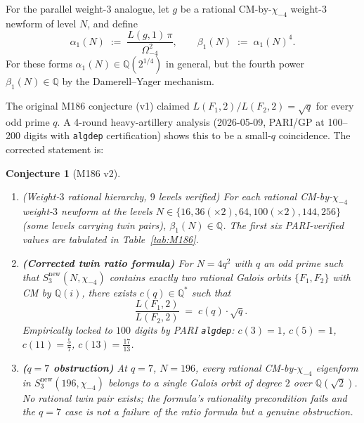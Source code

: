 \documentclass[12pt]{amsart}
\newtheorem{conjecture}[theorem]{Conjecture}
\theoremstyle{definition}
\newcommand{\Q}{\mathbb{Q}}
\begin{document}
For the parallel weight-$3$ analogue, let $g$ be a rational
CM-by-$\chi_{-4}$ weight-$3$ newform of level $N$, and define
\[
  \alpha_1(N) \;:=\; \frac{L(g,1)\,\pi}{\Omega_{-4}^2}, \qquad
  \beta_1(N) \;:=\; \alpha_1(N)^4.
\]
For these forms $\alpha_1(N) \in \Q(2^{1/4})$ in general, but the
fourth power $\beta_1(N) \in \Q$ by the Damerell--Yager mechanism.

The original M186 conjecture (v1) claimed $L(F_1,2)/L(F_2,2)=\sqrt{q}$
for every odd prime $q$.  A 4-round heavy-artillery analysis (2026-05-09,
PARI/GP at 100--200 digits with \texttt{algdep} certification) shows this
to be a small-$q$ coincidence.  The corrected statement is:

\begin{conjecture}[M186 v2]\label{conj:M186}
\leavevmode
\begin{enumerate}[leftmargin=2em]
  \item (Weight-$3$ rational hierarchy, $9$ levels verified) For each
    rational CM-by-$\chi_{-4}$ weight-$3$ newform at the levels
    $N \in \{16, 36(\times 2), 64, 100(\times 2), 144, 256\}$ (some
    levels carrying twin pairs), $\beta_1(N) \in \Q$. The first six
    PARI-verified values are tabulated in Table~\ref{tab:M186}.
  \item \textbf{(Corrected twin ratio formula)} For $N = 4q^2$ with $q$
    an odd prime such that $S_3^{\mathrm{new}}(N,\chi_{-4})$ contains
    exactly two rational Galois orbits $\{F_1,F_2\}$ with CM by
    $\Q(i)$, there exists $c(q)\in\Q^*$ such that
    \[
      \frac{L(F_1,2)}{L(F_2,2)} \;=\; c(q)\cdot\sqrt{q}.
    \]
    Empirically locked to $100$ digits by PARI \texttt{algdep}:
    $c(3)=1$, $c(5)=1$, $c(11)=\tfrac{5}{7}$, $c(13)=\tfrac{17}{13}$.
  \item \textbf{($q=7$ obstruction)} At $q=7$, $N=196$, every rational
    CM-by-$\chi_{-4}$ eigenform in $S_3^{\mathrm{new}}(196,\chi_{-4})$
    belongs to a single Galois orbit of degree $2$ over $\Q(\sqrt{2})$.
    No rational twin pair exists; the formula's rationality precondition
    fails and the $q=7$ case is not a failure of the ratio formula but a
    genuine obstruction.
\end{enumerate}
\end{conjecture}
\end{document}
